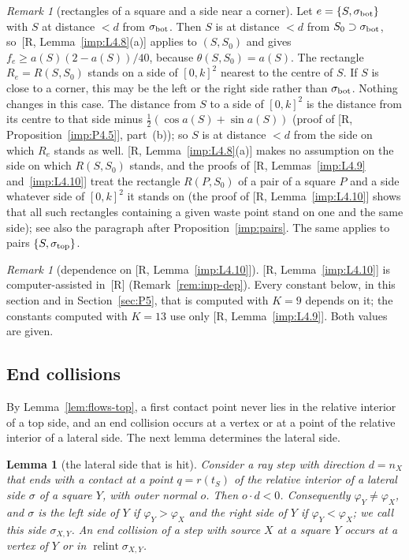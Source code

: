 \documentclass[11pt]{amsart}
\newcommand{\relint}{\operatorname{relint}}
\newtheorem{lemma}[theorem]{Lemma}
\theoremstyle{definition}
\theoremstyle{remark}
\newtheorem{remark}[theorem]{Remark}
\numberwithin{equation}{section}
\begin{document}
\begin{remark}[rectangles of a square and a side near a corner]\label{rem:P3-corner}
Let $e=\{S,\sigma_{\rm bot}\}$ with $S$ at distance $<d$ from $\sigma_{\rm bot}$. Then $S$ is at distance $<d$ from $S_0\supset\sigma_{\rm bot}$, so~[R, Lemma~\ref{imp:L4.8}(a)] applies to $(S,S_0)$ and gives $f_e\ge a(S)(2-a(S))/40$, because $\theta(S,S_0)=a(S)$. The rectangle $R_e=R(S,S_0)$ stands on a side of $[0,k]^2$ nearest to the centre of $S$. If $S$ is close to a corner, this may be the left or the right side rather than $\sigma_{\rm bot}$. Nothing changes in this case. The distance from $S$ to a side of $[0,k]^2$ is the distance from its centre to that side minus $\frac12(\cos a(S)+\sin a(S))$ (proof of [R, Proposition~\ref{imp:P4.5}], part~(b)); so $S$ is at distance $<d$ from the side on which $R_e$ stands as well. [R, Lemma~\ref{imp:L4.8}(a)] makes no assumption on the side on which $R(S,S_0)$ stands, and the proofs of [R, Lemmas~\ref{imp:L4.9} and~\ref{imp:L4.10}] treat the rectangle $R(P,S_0)$ of a pair of a square $P$ and a side whatever side of $[0,k]^2$ it stands on (the proof of [R, Lemma~\ref{imp:L4.10}] shows that all such rectangles containing a given waste point stand on one and the same side); see also the paragraph after Proposition~\ref{imp:pairs}. The same applies to pairs $\{S,\sigma_{\rm top}\}$.
\end{remark}

\begin{remark}[dependence on {[R, Lemma~\ref{imp:L4.10}]}]\label{rem:P3-dependence}
[R, Lemma~\ref{imp:L4.10}] is computer-assisted in~[R] (Remark~\ref{rem:imp-dep}). Every constant below, in this section and in Section~\ref{sec:P5}, that is computed with $K=9$ depends on it; the constants computed with $K=13$ use only [R, Lemma~\ref{imp:L4.9}]. Both values are given.
\end{remark}

\subsection{End collisions}\label{ssec:P3-E}

By Lemma~\ref{lem:flows-top}, a first contact point never lies in the relative interior of a top side, and an end collision occurs at a vertex or at a point of the relative interior of a lateral side. The next lemma determines the lateral side.

\begin{lemma}[the lateral side that is hit]\label{lem:P3-sides}
Consider a ray step with direction $d=n_X$ that ends with a contact at a point $q=r(t_S)$ of the relative interior of a lateral side $\sigma$ of a square $Y$, with outer normal $o$. Then $o\cdot d<0$. Consequently $\varphi_Y\ne\varphi_X$, and $\sigma$ is the left side of $Y$ if $\varphi_Y>\varphi_X$ and the right side of $Y$ if $\varphi_Y<\varphi_X$; we call this side $\sigma_{X,Y}$. An end collision of a step with source $X$ at a square $Y$ occurs at a vertex of $Y$ or in $\relint\sigma_{X,Y}$.
\end{lemma}
\end{document}
